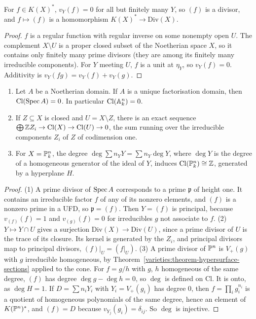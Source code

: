 \begin{lemma}\label{divisors:lemma-finite-sum}
For $f \in K(X)^*$, $v_Y(f) = 0$ for all but finitely many $Y$, so $(f)$ is a divisor, and $f \mapsto (f)$ is a homomorphism $K(X)^* \to \mathrm{Div}(X)$.
\end{lemma}

\begin{proof}
$f$ is a regular function with regular inverse on some nonempty open $U$. The complement $X \setminus U$ is a proper closed subset of the Noetherian space $X$, so
it contains only finitely many prime divisors (they are among its finitely many irreducible components). For $Y$ meeting $U$, $f$ is a unit at $\eta_Y$, so
$v_Y(f) = 0$. Additivity is $v_Y(fg) = v_Y(f) + v_Y(g)$.
\end{proof}

\begin{proposition}\label{divisors:proposition-class-group}
\begin{enumerate}
\item Let $A$ be a Noetherian domain. If $A$ is a unique factorisation domain, then $\mathrm{Cl}(\operatorname{Spec} A) = 0$. In particular $\mathrm{Cl}(\mathbb{A}^n_k) = 0$.
\item If $Z \subseteq X$ is closed and $U = X \setminus Z$, there is an exact sequence $\bigoplus\mathbb{Z} Z_i \to \mathrm{Cl}(X) \to \mathrm{Cl}(U) \to 0$, the sum running over the
irreducible components $Z_i$ of $Z$ of codimension one.
\item For $X = \mathbb{P}^n_k$, the degree $\deg\sum n_YY = \sum n_Y\deg Y$, where $\deg Y$ is the degree of a homogeneous generator of the ideal of $Y$, induces
$\mathrm{Cl}(\mathbb{P}^n_k) \cong \mathbb{Z}$, generated by a hyperplane $H$.
\end{enumerate}
\end{proposition}

\begin{proof}
(1) A prime divisor of $\operatorname{Spec} A$ corresponds to a prime $\mathfrak{p}$ of height one. It contains an irreducible factor $f$ of any of its nonzero elements, and $(f)$ is a
nonzero prime in a UFD, so $\mathfrak{p} = (f)$. Then $Y = (f)$ is principal, because $v_{(f)}(f) = 1$ and $v_{(g)}(f) = 0$ for irreducibles $g$ not associate to $f$.
(2) $Y \mapsto Y \cap U$ gives a surjection $\mathrm{Div}(X) \to \mathrm{Div}(U)$, since a prime divisor of $U$ is the trace of its closure. Its kernel is generated by the
$Z_i$, and principal divisors map to principal divisors, $(f)|_U = (f|_U)$. (3) A prime divisor of $\mathbb{P}^n$ is $V_+(g)$ with $g$ irreducible homogeneous, by
Theorem~\ref{varieties:theorem-hypersurface-sections} applied to the cone. For $f = g/h$ with $g$, $h$ homogeneous of the same degree, $(f)$ has degree
$\deg g - \deg h = 0$, so $\deg$ is defined on $\mathrm{Cl}$. It is onto, as $\deg H = 1$. If $D = \sum n_iY_i$ with $Y_i = V_+(g_i)$ has degree $0$, then
$f = \prod_ig_i^{n_i}$ is a quotient of homogeneous polynomials of the same degree, hence an element of $K(\mathbb{P}^n)^*$, and $(f) = D$ because $v_{Y_j}(g_i) = \delta_{ij}$.
So $\deg$ is injective.
\end{proof}

